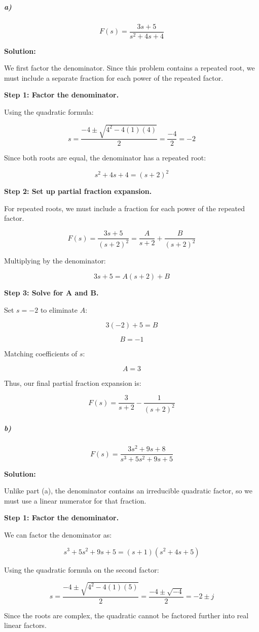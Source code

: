 \documentclass{article}
\begin{document}
\subparagraph{a)}
\[
F(s)=\frac{3s+5}{s^2+4s+4}
\]

\textbf{Solution:}

We first factor the denominator. Since this problem contains a repeated root, we must include a separate fraction for each power of the repeated factor.

\textbf{Step 1: Factor the denominator.}

Using the quadratic formula:

\[
s=\frac{-4\pm\sqrt{4^2-4(1)(4)}}{2}
=\frac{-4}{2}=-2
\]

Since both roots are equal, the denominator has a repeated root:

\[
s^2+4s+4=(s+2)^2
\]

\textbf{Step 2: Set up partial fraction expansion.}

For repeated roots, we must include a fraction for each power of the repeated factor.

\[
F(s)
=\frac{3s+5}{(s+2)^2}
=\frac{A}{s+2}+\frac{B}{(s+2)^2}
\]

Multiplying by the denominator:

\[
3s+5=A(s+2)+B
\]

\textbf{Step 3: Solve for A and B.}

Set $s=-2$ to eliminate $A$:

\[
3(-2)+5=B
\]

\[
\boxed{B=-1}
\]

Matching coefficients of $s$:

\[
\boxed{A=3}
\]

Thus, our final partial fraction expansion is:

\[
\boxed{F(s)=\frac{3}{s+2}-\frac{1}{(s+2)^2}}
\]


\subparagraph{b)}
\[
F(s)=\frac{3s^2+9s+8}{s^3+5s^2+9s+5}
\]

\textbf{Solution:}

Unlike part (a), the denominator contains an irreducible quadratic factor, so we must use a linear numerator for that fraction.

\textbf{Step 1: Factor the denominator.}

We can factor the denominator as:

\[
s^3+5s^2+9s+5=(s+1)(s^2+4s+5)
\]

Using the quadratic formula on the second factor:

\[
s=\frac{-4\pm\sqrt{4^2-4(1)(5)}}{2}
=\frac{-4\pm\sqrt{-4}}{2}
=-2\pm j
\]

Since the roots are complex, the quadratic cannot be factored further into real linear factors.
\end{document}
